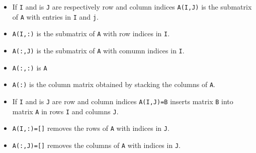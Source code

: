 \begin{itemize}
   \item If \verb+I+ and is \verb+J+ are respectively row and column indices \verb+A(I,J)+ is the submatrix of \verb+A+ with entries in \verb+I+ and \verb+j+.
   \item \verb+A(I,:)+ is the submatrix of \verb+A+ with row indices in \verb+I+.
   \item \verb+A(:,J)+ is the submatrix of \verb+A+ with comumn indices in \verb+I+.
   \item \verb+A(:,:)+ is \verb+A+
   \item \verb+A(:)+  is the column matrix obtained by stacking the columns of \verb+A+.
\end{itemize}
\begin{itemize}
   \item If \verb+I+ and is \verb+J+ are row and column indices \verb+A(I,J)=B+ inserts
matrix \verb+B+ into matrix \verb+A+ in rows \verb+I+ and columns \verb!J!.
   \item \verb+A(I,:)=[]+ removes the rows of \verb+A+ with indices in \verb+J+.
   \item \verb+A(:,J)=[]+ removes the columns of \verb+A+ with indices in \verb+J+.
\end{itemize}

